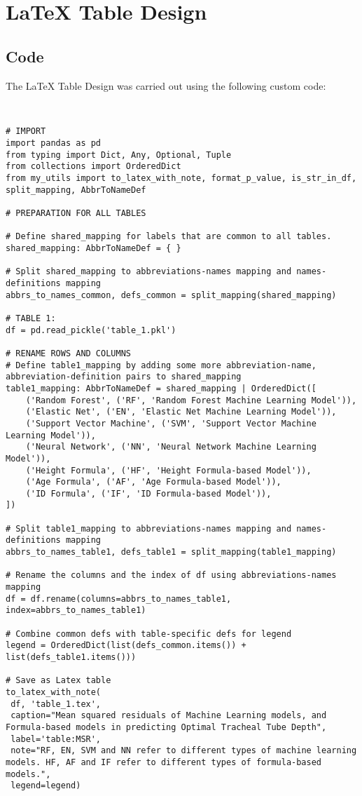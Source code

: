 \documentclass[11pt]{article}
\begin{document}
\section{LaTeX Table Design}
\subsection{{Code}}
The LaTeX Table Design was carried out using the following custom code:

\begin{verbatim}


# IMPORT
import pandas as pd
from typing import Dict, Any, Optional, Tuple
from collections import OrderedDict
from my_utils import to_latex_with_note, format_p_value, is_str_in_df, split_mapping, AbbrToNameDef

# PREPARATION FOR ALL TABLES

# Define shared_mapping for labels that are common to all tables.
shared_mapping: AbbrToNameDef = { }

# Split shared_mapping to abbreviations-names mapping and names-definitions mapping
abbrs_to_names_common, defs_common = split_mapping(shared_mapping)

# TABLE 1:
df = pd.read_pickle('table_1.pkl')

# RENAME ROWS AND COLUMNS 
# Define table1_mapping by adding some more abbreviation-name, abbreviation-definition pairs to shared_mapping
table1_mapping: AbbrToNameDef = shared_mapping | OrderedDict([
    ('Random Forest', ('RF', 'Random Forest Machine Learning Model')),
    ('Elastic Net', ('EN', 'Elastic Net Machine Learning Model')),
    ('Support Vector Machine', ('SVM', 'Support Vector Machine Learning Model')),
    ('Neural Network', ('NN', 'Neural Network Machine Learning Model')),
    ('Height Formula', ('HF', 'Height Formula-based Model')),
    ('Age Formula', ('AF', 'Age Formula-based Model')),
    ('ID Formula', ('IF', 'ID Formula-based Model')),
])

# Split table1_mapping to abbreviations-names mapping and names-definitions mapping
abbrs_to_names_table1, defs_table1 = split_mapping(table1_mapping)

# Rename the columns and the index of df using abbreviations-names mapping
df = df.rename(columns=abbrs_to_names_table1, index=abbrs_to_names_table1)

# Combine common defs with table-specific defs for legend
legend = OrderedDict(list(defs_common.items()) + list(defs_table1.items()))

# Save as Latex table
to_latex_with_note(
 df, 'table_1.tex',
 caption="Mean squared residuals of Machine Learning models, and Formula-based models in predicting Optimal Tracheal Tube Depth", 
 label='table:MSR',
 note="RF, EN, SVM and NN refer to different types of machine learning models. HF, AF and IF refer to different types of formula-based models.",
 legend=legend)


\end{verbatim}
\end{document}
